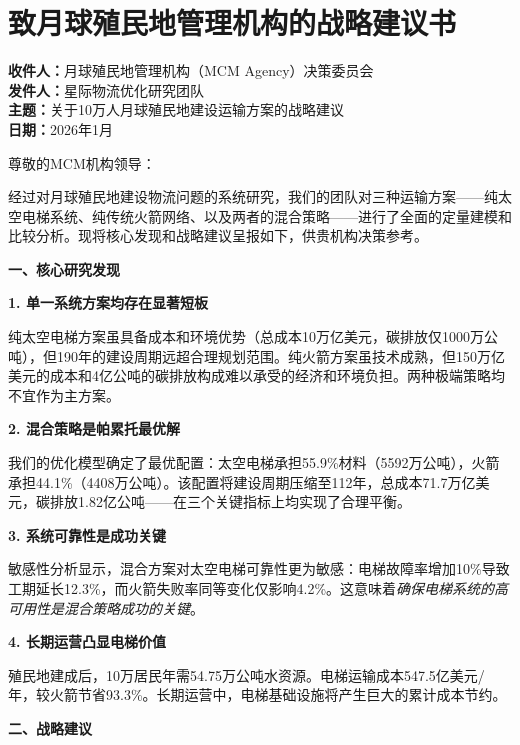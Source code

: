 \newpage
\section*{致月球殖民地管理机构的战略建议书}

\vspace{0.5em}

\noindent\textbf{收件人：}月球殖民地管理机构（MCM Agency）决策委员会\\
\textbf{发件人：}星际物流优化研究团队\\
\textbf{主题：}关于10万人月球殖民地建设运输方案的战略建议\\
\textbf{日期：}2026年1月

\vspace{1em}

尊敬的MCM机构领导：

经过对月球殖民地建设物流问题的系统研究，我们的团队对三种运输方案——纯太空电梯系统、纯传统火箭网络、以及两者的混合策略——进行了全面的定量建模和比较分析。现将核心发现和战略建议呈报如下，供贵机构决策参考。

\vspace{0.5em}
\noindent\textbf{一、核心研究发现}

\textbf{1. 单一系统方案均存在显著短板}

纯太空电梯方案虽具备成本和环境优势（总成本10万亿美元，碳排放仅1000万公吨），但190年的建设周期远超合理规划范围。纯火箭方案虽技术成熟，但150万亿美元的成本和4亿公吨的碳排放构成难以承受的经济和环境负担。两种极端策略均不宜作为主方案。

\textbf{2. 混合策略是帕累托最优解}

我们的优化模型确定了最优配置：太空电梯承担55.9\%材料（5592万公吨），火箭承担44.1\%（4408万公吨）。该配置将建设周期压缩至112年，总成本71.7万亿美元，碳排放1.82亿公吨——在三个关键指标上均实现了合理平衡。

\textbf{3. 系统可靠性是成功关键}

敏感性分析显示，混合方案对太空电梯可靠性更为敏感：电梯故障率增加10\%导致工期延长12.3\%，而火箭失败率同等变化仅影响4.2\%。这意味着\textit{确保电梯系统的高可用性是混合策略成功的关键}。

\textbf{4. 长期运营凸显电梯价值}

殖民地建成后，10万居民年需54.75万公吨水资源。电梯运输成本547.5亿美元/年，较火箭节省93.3\%。长期运营中，电梯基础设施将产生巨大的累计成本节约。

\vspace{0.5em}
\noindent\textbf{二、战略建议}


